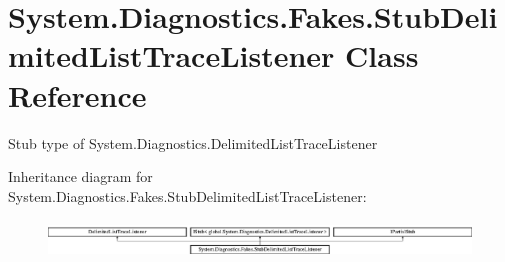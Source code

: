 \hypertarget{class_system_1_1_diagnostics_1_1_fakes_1_1_stub_delimited_list_trace_listener}{\section{System.\-Diagnostics.\-Fakes.\-Stub\-Delimited\-List\-Trace\-Listener Class Reference}
\label{class_system_1_1_diagnostics_1_1_fakes_1_1_stub_delimited_list_trace_listener}
}


Stub type of System.\-Diagnostics.\-Delimited\-List\-Trace\-Listener 


Inheritance diagram for System.\-Diagnostics.\-Fakes.\-Stub\-Delimited\-List\-Trace\-Listener\-:\begin{figure}[H]
\begin{center}
\leavevmode
\includegraphics[height=1.006289cm]{class_system_1_1_diagnostics_1_1_fakes_1_1_stub_delimited_list_trace_listener}
\end{center}
\end{figure}
